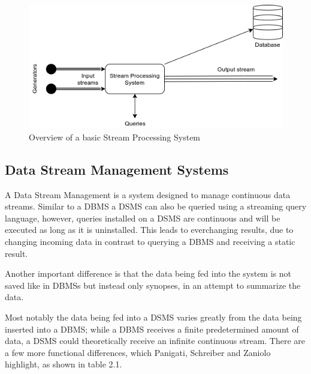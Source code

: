         \begin{figure}
        \centering
        \includegraphics[width=1.0\textwidth]{Bilder/stream-processing-system.png}
        \caption{
                Overview of a basic Stream Processing System
                }
        \label{fig:stream-processing-system}
        \end{figure}


        \subsection{Data Stream Management Systems}
        A Data Stream Management is a system designed to manage continuous data streams.
        Similar to a DBMS a DSMS can also be queried using a streaming query language, however, queries installed on a DSMS are continuous 
        and will be executed as long as it is uninstalled.
        This leads to everchanging results, due to changing incoming data in contrast to querying a DBMS and receiving a static result.
        
        Another important difference is that the data being fed into the system is not saved like in DBMSs but instead only synopses, in 
        an attempt to summarize the data.
        
        Most notably the data being fed into a DSMS varies greatly from the data being inserted into a DBMS; while a DBMS receives a finite predetermined amount 
        of data, a DSMS could theoretically receive an infinite continuous stream.
        There are a few more functional differences, which Panigati, Schreiber and Zaniolo highlight, as shown in table 2.1.

